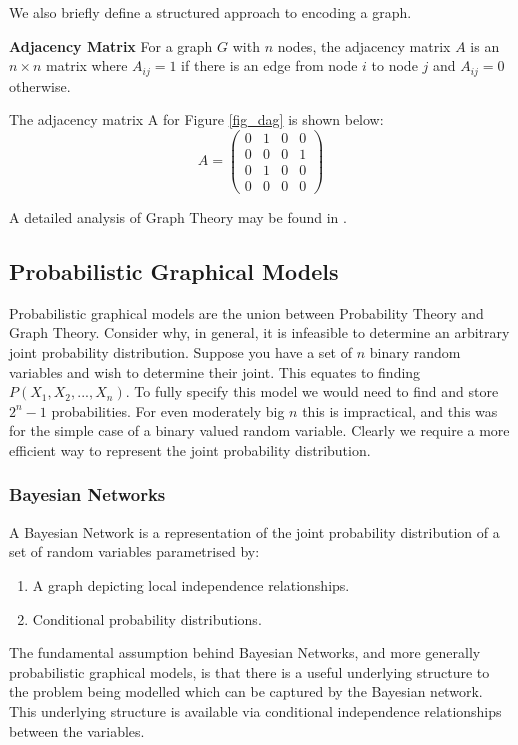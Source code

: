 \documentclass[../masters.tex]{subfiles}
\begin{document}
We also briefly define a structured approach to encoding a graph.
\begin{defn}
\textbf{Adjacency Matrix} For a graph $G$ with $n$ nodes, the adjacency matrix $A$ is an $n \times n$ matrix where $A_{ij} = 1$ if there is an edge from node $i$ to node $j$ and $A_{ij} = 0$ otherwise. 
\end{defn}
The adjacency matrix A for Figure \ref{fig_dag} is shown below:
\begin{equation*}
A = \begin{pmatrix}
0 & 1 & 0 & 0 \\
0 & 0 & 0 & 1 \\
0 & 1 & 0 & 0 \\
0 & 0 & 0 & 0
\end{pmatrix}
\end{equation*}

A detailed analysis of Graph Theory may be found in \cite{deo}.

\subsection{Probabilistic Graphical Models}
Probabilistic graphical models are the union between Probability Theory and Graph Theory. Consider why, in general, it is infeasible to determine an arbitrary joint probability distribution. Suppose you have a set of $n$ binary random variables and wish to determine their joint. This equates to finding $P(X_1,X_2,...,X_n)$. To fully specify this model we would need to find and store $2^n-1$ probabilities. For even moderately big $n$ this is impractical, and this was for the simple case of a binary valued random variable. Clearly we require a more efficient way to represent the joint probability distribution.

\subsubsection{Bayesian Networks}
A Bayesian Network is a representation of the joint probability distribution of a set of random variables parametrised by:
\begin{enumerate}
\item
A graph depicting local independence relationships.
\item
Conditional probability distributions.
\end{enumerate}  
The fundamental assumption behind Bayesian Networks, and more generally probabilistic graphical models, is that there is a useful underlying structure to the problem being modelled which can be captured by the Bayesian network. This underlying structure is available via conditional independence relationships between the variables.
\end{document}
